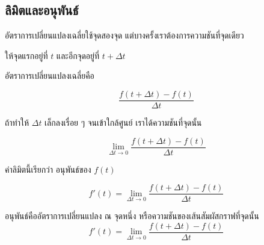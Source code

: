 \subsection{ลิมิตและอนุพันธ์}

อัตราการเปลี่ยนแปลงเฉลี่ยใช้จุดสองจุด แต่บางครั้งเราต้องการความชันที่จุดเดียว

ให้จุดแรกอยู่ที่ $t$ และอีกจุดอยู่ที่ $t+\Delta t$

อัตราการเปลี่ยนแปลงเฉลี่ยคือ

\[
\frac{f(t+\Delta t)-f(t)}{\Delta t}
\]

ถ้าทำให้ $\Delta t$ เล็กลงเรื่อย ๆ จนเข้าใกล้ศูนย์ เราได้ความชันที่จุดนั้น

\[
\lim_{\Delta t\to 0}
\frac{f(t+\Delta t)-f(t)}{\Delta t}
\]

ค่าลิมิตนี้เรียกว่า อนุพันธ์ของ $f(t)$

\[
f'(t)=\lim_{\Delta t\to 0}
\frac{f(t+\Delta t)-f(t)}{\Delta t}
\]

\begin{tcolorbox}[title=นิยามของอนุพันธ์]
อนุพันธ์คืออัตราการเปลี่ยนแปลง ณ จุดหนึ่ง หรือความชันของเส้นสัมผัสกราฟที่จุดนั้น
\[
f'(t)=\lim_{\Delta t\to 0}
\frac{f(t+\Delta t)-f(t)}{\Delta t}
\]
\end{tcolorbox}

\begin{center}
\end{center}

